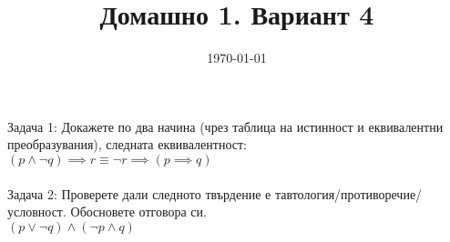 \documentclass{article}
\begin{document}
     
\title{Домашно 1. Вариант 4}
\date{\today}
\maketitle
    
Задача 1: Докажете по два начина (чрез таблица на истинност и еквивалентни преобразувания), следната еквивалентност: \\

$ (p \land \lnot q) \implies r \equiv \lnot r \implies (p \implies q) $ \\\\

Задача 2: Проверете дали следното твърдение е тавтология/противоречие/условност. Обосновете отговора си. \\

$ (p \lor \lnot q) \land (\lnot p \land q) $
\end{document}
